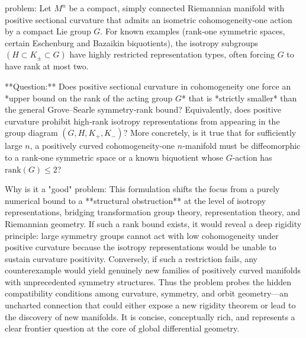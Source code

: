 problem:  
Let \( M^n \) be a compact, simply connected Riemannian manifold with positive sectional curvature that admits an isometric cohomogeneity‑one action by a compact Lie group \( G \).  For known examples (rank‑one symmetric spaces, certain Eschenburg and Bazaikin biquotients), the isotropy subgroups \( (H \subset K_\pm \subset G) \) have highly restricted representation types, often forcing \( G \) to have rank at most two.  

**Question:**  
Does positive sectional curvature in cohomogeneity one force an *upper bound on the rank of the acting group \(G\)* that is *strictly smaller* than the general Grove–Searle symmetry‑rank bound?  
Equivalently, does positive curvature prohibit high‑rank isotropy representations from appearing in the group diagram \( (G,H,K_+,K_-) \)?  
More concretely, is it true that for sufficiently large \(n\), a positively curved cohomogeneity‑one \(n\)‑manifold must be diffeomorphic to a rank‑one symmetric space or a known biquotient whose \(G\)-action has \(\mathrm{rank}(G)\le 2\)?  

Why is it a "good" problem:  
This formulation shifts the focus from a purely numerical bound to a **structural obstruction** at the level of isotropy representations, bridging transformation group theory, representation theory, and Riemannian geometry.  If such a rank bound exists, it would reveal a deep rigidity principle: large symmetry groups cannot act with low cohomogeneity under positive curvature because the isotropy representations would be unable to sustain curvature positivity.  Conversely, if such a restriction fails, any counterexample would yield genuinely new families of positively curved manifolds with unprecedented symmetry structures.  Thus the problem probes the hidden compatibility conditions among curvature, symmetry, and orbit geometry—an uncharted connection that could either expose a new rigidity theorem or lead to the discovery of new manifolds.  It is concise, conceptually rich, and represents a clear frontier question at the core of global differential geometry.